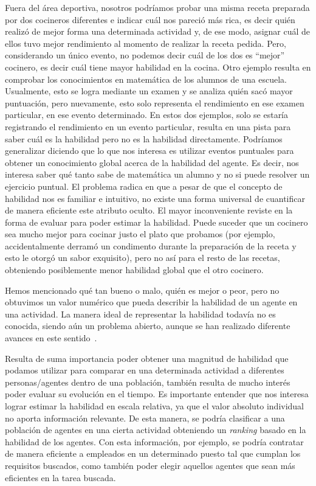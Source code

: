 \documentclass[11pt,twoside,spanish]{report} %
\begin{document}
Fuera del \'area deportiva, nosotros podr\'iamos probar una misma receta preparada por dos cocineros diferentes e indicar cu\'al nos pareci\'o m\'as rica, es decir qui\'en realiz\'o de mejor forma una determinada actividad y, de ese modo, asignar cu\'al de ellos tuvo mejor rendimiento al momento de realizar la receta pedida.
Pero, considerando un \'unico evento, no podemos decir cu\'al de los dos es ``mejor'' cocinero, es decir cu\'al tiene mayor habilidad en la cocina.
Otro ejemplo resulta en comprobar los conocimientos en matem\'atica de los alumnos de una escuela. 
Usualmente, esto se logra mediante un examen y se analiza qui\'en sac\'o mayor puntuaci\'on, pero nuevamente, esto solo representa el rendimiento en ese examen particular, en ese evento determinado.
En estos dos ejemplos, solo se estar\'ia registrando el rendimiento en un evento particular, resulta en una pista para saber cu\'al es la habilidad pero no es la habilidad directamente.
Podr\'iamos generalizar diciendo que lo que nos interesa es utilizar eventos puntuales para obtener un conocimiento global acerca de la habilidad del agente.
Es decir, nos interesa saber qu\'e tanto sabe de matem\'atica un alumno y no si puede resolver un ejercicio puntual.
El problema radica en que a pesar de que el concepto de habilidad nos es familiar e intuitivo, no existe una forma universal de cuantificar de manera eficiente este atributo oculto.
El mayor inconveniente reviste en la forma de evaluar para poder estimar la habilidad.
Puede suceder que un cocinero sea mucho mejor para cocinar justo el plato que probamos (por ejemplo, accidentalmente derram\'o un condimento durante la preparaci\'on de la receta y esto le otorg\'o un sabor exquisito), pero no as\'i para el resto de las recetas, obteniendo posiblemente menor habilidad global que el otro cocinero.

Hemos mencionado qu\'e tan bueno o malo, qui\'en es mejor o peor, pero no obtuvimos un valor num\'erico que pueda describir la habilidad de un agente en una actividad.
La manera ideal de representar la habilidad todav\'ia no es conocida, siendo a\'un un problema abierto, aunque se han realizado diferente avances en este sentido~\cite{Glickman1999,Elo2008,Herbrich2007}.

Resulta de suma importancia poder obtener una magnitud de habilidad que podamos utilizar para comparar en una determinada actividad a diferentes personas/agentes dentro de una poblaci\'on, tambi\'en resulta de mucho inter\'es poder evaluar su evoluci\'on en el tiempo.
Es importante entender que nos interesa lograr estimar la habilidad en escala relativa, ya que el valor absoluto individual no aporta informaci\'on relevante.
De esta manera, se podr\'ia clasificar a una poblaci\'on de agentes en una cierta actividad obteniendo un \emph{ranking} basado en la habilidad de los agentes.
Con esta informaci\'on, por ejemplo, se podr\'ia contratar de manera eficiente a empleados en un determinado puesto tal que cumplan los requisitos buscados, como tambi\'en poder elegir aquellos agentes que sean m\'as eficientes en la tarea buscada.
\end{document}
